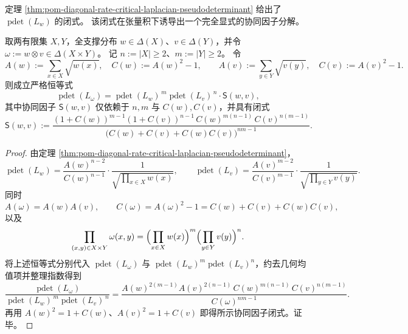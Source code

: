 定理 \ref{thm:pom-diagonal-rate-critical-laplacian-pseudodeterminant} 给出了 \(\operatorname{pdet}(L_w)\) 的闭式。
该闭式在张量积下诱导出一个完全显式的协同因子分解。

\begin{theorem}[伪行列式在张量积下的协同因子分解]\label{thm:pom-diagonal-rate-critical-laplacian-pdet-tensor-synergy-factorization}
取两有限集 \(X,Y\)，全支撑分布 \(w\in\Delta(X)\)、\(v\in\Delta(Y)\)，并令 \(\omega:=w\otimes v\in\Delta(X\times Y)\)。
记 \(n:=|X|\ge 2\)、\(m:=|Y|\ge 2\)。
令
\[
A(w):=\sum_{x\in X}\sqrt{w(x)},\quad C(w):=A(w)^2-1,
\qquad
A(v):=\sum_{y\in Y}\sqrt{v(y)},\quad C(v):=A(v)^2-1.
\]
则成立严格恒等式
\[
\operatorname{pdet}(L_{\omega})
=\operatorname{pdet}(L_w)^{\,m}\operatorname{pdet}(L_v)^{\,n}\cdot \mathsf S(w,v),
\]
其中协同因子 \(\mathsf S(w,v)\) 仅依赖于 \(n,m\) 与 \(C(w),C(v)\)，并具有闭式
\[
\mathsf S(w,v)
:=\frac{(1+C(w))^{m-1}(1+C(v))^{n-1}\,C(w)^{m(n-1)}\,C(v)^{n(m-1)}}
{\bigl(C(w)+C(v)+C(w)C(v)\bigr)^{nm-1}}.
\]
\end{theorem}
\begin{proof}
由定理 \ref{thm:pom-diagonal-rate-critical-laplacian-pseudodeterminant}，
\[
\operatorname{pdet}(L_w)=\frac{A(w)^{n-2}}{C(w)^{n-1}}\cdot \frac{1}{\sqrt{\prod_{x\in X}w(x)}},
\qquad
\operatorname{pdet}(L_v)=\frac{A(v)^{m-2}}{C(v)^{m-1}}\cdot \frac{1}{\sqrt{\prod_{y\in Y}v(y)}}.
\]
同时
\[
A(\omega)=A(w)A(v),\qquad
C(\omega)=A(\omega)^2-1=C(w)+C(v)+C(w)C(v),
\]
以及
\[
\prod_{(x,y)\in X\times Y}\omega(x,y)
=\Bigl(\prod_{x\in X}w(x)\Bigr)^{m}\Bigl(\prod_{y\in Y}v(y)\Bigr)^{n}.
\]
将上述恒等式分别代入 \(\operatorname{pdet}(L_\omega)\) 与 \(\operatorname{pdet}(L_w)^m\operatorname{pdet}(L_v)^n\)，约去几何均值项并整理指数得到
\[
\frac{\operatorname{pdet}(L_{\omega})}{\operatorname{pdet}(L_w)^{\,m}\operatorname{pdet}(L_v)^{\,n}}
=\frac{A(w)^{2(m-1)}A(v)^{2(n-1)}\,C(w)^{m(n-1)}\,C(v)^{n(m-1)}}
{C(\omega)^{nm-1}}.
\]
再用 \(A(w)^2=1+C(w)\)、\(A(v)^2=1+C(v)\) 即得所示协同因子闭式。证毕。
\end{proof}

